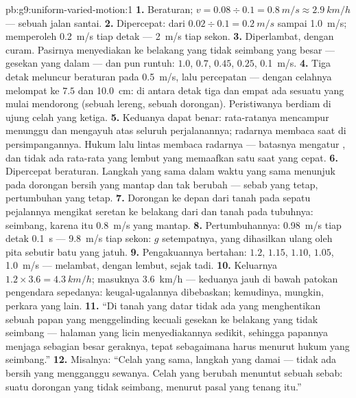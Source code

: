 \begin{solution}{pb:g9:uniform-varied-motion:1}
\textbf{1.} Beraturan; $v = 0.08 \div 0.1 = \qty{0.8}{m/s}
\approx \qty{2.9}{km/h}$ --- sebuah jalan santai.
\textbf{2.} Dipercepat: dari $0.02 \div 0.1 = \qty{0.2}{m/s}$
sampai \qty{1.0}{m/s}; memperoleh \qty{0.2}{m/s} tiap detak ---
\qty{2}{m/s} tiap sekon.
\textbf{3.} Diperlambat, dengan curam. Pasirnya menyediakan  ke
belakang yang tidak seimbang yang besar --- gesekan yang dalam --- dan
 pun runtuh: $1.0$, $0.7$, $0.45$, $0.25$,
\qty{0.1}{m/s}.
\textbf{4.} Tiga detak meluncur beraturan pada \qty{0.5}{m/s}, lalu
percepatan --- dengan celahnya melompat ke $7.5$ dan
\qty{10.0}{cm}: di antara detak tiga dan empat ada sesuatu yang mulai
mendorong (sebuah lereng, sebuah dorongan). Peristiwanya berdiam di
ujung celah yang ketiga.
\textbf{5.} Keduanya dapat benar: rata-ratanya mencampur menunggu dan
mengayuh atas seluruh perjalanannya; radarnya membaca saat di
persimpangannya. Hukum lalu lintas membaca radarnya --- batasnya
mengatur , dan tidak ada rata-rata yang lembut yang
memaafkan satu saat yang cepat.
\textbf{6.} Dipercepat beraturan. Langkah  yang sama dalam
waktu yang sama menunjuk pada dorongan bersih yang mantap dan tak
berubah --- sebab yang tetap, pertumbuhan yang tetap.
\textbf{7.} Dorongan ke depan dari tanah pada sepatu pejalannya
mengikat seretan ke belakang dari  dan tanah pada tubuhnya:
seimbang, karena itu \qty{0.8}{m/s} yang mantap.
\textbf{8.} Pertumbuhannya: \qty{0.98}{m/s} tiap detak \qty{0.1}{s}
--- \qty{9.8}{m/s} tiap sekon: $g$ setempatnya, yang dihasilkan ulang
oleh pita sebutir batu yang jatuh.
\textbf{9.} Pengakuannya bertahan:  $1.2$, $1.15$, $1.10$,
$1.05$, \qty{1.0}{m/s} --- melambat, dengan lembut, sejak tadi.
\textbf{10.} Keluarnya $1.2 \times 3.6 = \qty{4.3}{km/h}$; masuknya
\qty{3.6}{km/h} --- keduanya jauh di bawah patokan pengendara
sepedanya: keugal-ugalannya dibebaskan; kemudinya, mungkin, perkara
yang lain.
\textbf{11.} ``Di tanah yang datar tidak ada yang menghentikan sebuah
papan yang menggelinding kecuali gesekan ke belakang yang tidak
seimbang --- halaman yang licin menyediakannya sedikit, sehingga
papannya menjaga sebagian besar geraknya, tepat sebagaimana harus
menurut hukum  yang seimbang.''
\textbf{12.} Misalnya: ``Celah yang sama, langkah yang damai --- tidak
ada  bersih yang mengganggu sewanya. Celah yang berubah menuntut
sebuah sebab: suatu dorongan yang tidak seimbang, menurut pasal yang
tenang itu.''
\end{solution}
